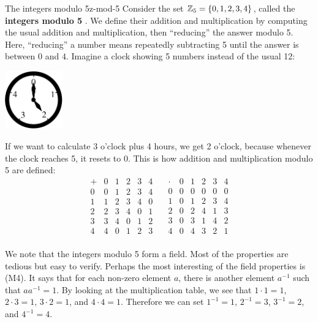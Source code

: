 \begin{example}{The integers modulo 5}{z-mod-5}
  Consider the set $\mathbb{Z}_5=\left\{0,1,2,3,4\right\}$, called the \textbf{integers
    modulo 5}%
  . We define their addition and
  multiplication by computing the usual addition and multiplication,
  then ``reducing'' the answer modulo 5. Here, ``reducing'' a number
  means repeatedly subtracting 5 until the answer is between $0$ and
  $4$. Imagine a clock showing 5 numbers instead of the usual 12:
  \begin{center}
    \includegraphics[width=2.5cm]{figures/clock}
  \end{center}
  If we want to calculate 3 o'clock plus 4 hours, we get 2 o'clock,
  because whenever the clock reaches 5, it resets to 0. This is how
  addition and multiplication modulo 5 are defined:
  \begin{equation*}
    \begin{array}{l|lllll}
      +&0&1&2&3&4 \\\hline
      0&0&1&2&3&4 \\
      1&1&2&3&4&0 \\
      2&2&3&4&0&1 \\
      3&3&4&0&1&2 \\
      4&4&0&1&2&3 \\
    \end{array}
    \quad
    \begin{array}{l|lllll}
      \cdot&0&1&2&3&4 \\\hline
      0&0&0&0&0&0 \\
      1&0&1&2&3&4 \\
      2&0&2&4&1&3 \\
      3&0&3&1&4&2 \\
      4&0&4&3&2&1 \\
    \end{array}
  \end{equation*}
\end{example}

We note that the integers modulo 5 form a field. Most of the
properties are tedious but easy to verify. Perhaps the most
interesting of the field properties is (M4). It says that for each
non-zero element $a$, there is another element $a^{-1}$ such that
$aa^{-1}=1$.  By looking at the multiplication table, we see that
$1\cdot 1=1$, $2\cdot 3=1$, $3\cdot 2=1$, and $4\cdot 4=1$. Therefore
we can set $1^{-1}=1$, $2^{-1}=3$, $3^{-1}=2$, and $4^{-1}=4$.

